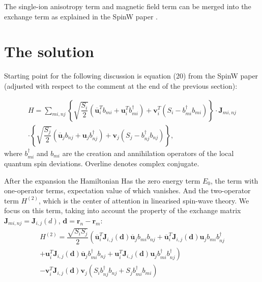 \documentclass[a4paper,12pt]{article}
\begin{document}
        The single-ion anisotropy term and magnetic field term can be merged into the exchange term as explained in the SpinW paper \cite{toth2015linear}.

    \section{The solution}

        Starting point for the following discussion is equation (20) from the SpinW paper \cite{toth2015linear} 
        (adjusted with respect to the comment at the end of the previous section):

        \begin{multline}
            H = \sum_{mi, nj}\left\{\sqrt{\dfrac{S_{i}}{2}}\left(\overline{\boldsymbol{u}}^T_i b_{mi} + \boldsymbol{u}^T_i b^{\dag}_{mi} \right) + 
            \boldsymbol{v}^T_i(S_i - b^{\dag}_{mi}b_{mi})\right\}  \cdot
            \boldsymbol{J}_{mi, nj}\\
            \cdot\left\{\sqrt{\dfrac{S_{j}}{2}}\left(\overline{\boldsymbol{u}}_j b_{nj} + \boldsymbol{u}_j b^{\dag}_{nj} \right) + 
            \boldsymbol{v}_j(S_j - b^{\dag}_{nj}b_{nj})\right\},
        \end{multline}
        where $b^{\dag}_{mi}$ and $b_{mi}$ are the creation and annihilation operators of the local quantum spin deviations. Overline denotes complex conjugate.

        After the expansion the Hamiltonian Has the zero energy term $E_0$, the term with one-operator terms, expectation value of which vanishes. 
        And the two-operator term $H^{(2)}$, which is the center of attention in linearised spin-wave theory. 
        We focus on this term, taking into account the property of the exchange matrix $\boldsymbol{J}_{mi, nj} = \boldsymbol{J}_{i,j}(d)$, $\boldsymbol{d} = \boldsymbol{r}_n - \boldsymbol{r}_m$:
        \begin{multline}
            H^{(2)} = \dfrac{\sqrt{S_i S_j}}{2}\left(\overline{\boldsymbol{u}}^T_i\boldsymbol{J}_{i,j}(\boldsymbol{d})\overline{\boldsymbol{u}}_jb_{mi}b_{nj} +
            \overline{\boldsymbol{u}}^T_i\boldsymbol{J}_{i,j}(\boldsymbol{d})\boldsymbol{u}_j b_{mi}b^{\dag}_{nj}\right. \\+ 
            \left.\boldsymbol{u}^T_i\boldsymbol{J}_{i,j}(\boldsymbol{d})\overline{\boldsymbol{u}}_jb^{\dag}_{mi}b_{nj} +
            \boldsymbol{u}^T_i\boldsymbol{J}_{i,j}(\boldsymbol{d})\boldsymbol{u}_jb^{\dag}_{mi}b^{\dag}_{nj}\right) \\-
            \boldsymbol{v}^T_i\boldsymbol{J}_{i,j}(\boldsymbol{d})\boldsymbol{v}_j\left(S_ib^{\dag}_{nj}b_{nj} + S_jb^{\dag}_{mi}b_{mi}\right)
        \end{multline}
\end{document}
